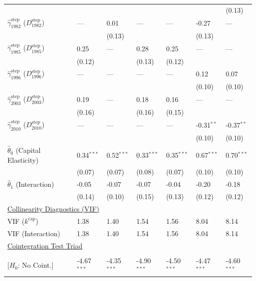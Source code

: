 \begin{table}[H]
\begin{tabular}{p{3.8cm}p{1.35cm}p{1.35cm}p{1.35cm}p{1.35cm}p{1.35cm}p{1.35cm}}
 &  &  &  &  &  & {\scriptsize (0.13)}  \\
$\hat{\gamma}^{\text{step}}_{1982}$ ($D^{\text{step}}_{1982}$)  & --- & 0.01 & --- & --- & -0.27 & ---  \\
 &  & {\scriptsize (0.13)} &  &  & {\scriptsize (0.13)} &   \\
$\hat{\gamma}^{\text{step}}_{1985}$ ($D^{\text{step}}_{1985}$)  & 0.25 & --- & 0.28 & 0.25 & --- & ---  \\
 & {\scriptsize (0.12)} &  & {\scriptsize (0.13)} & {\scriptsize (0.12)} &  &   \\
$\hat{\gamma}^{\text{step}}_{1996}$ ($D^{\text{step}}_{1996}$)  & --- & --- & --- & --- & 0.12 & 0.07  \\
 &  &  &  &  & {\scriptsize (0.10)} & {\scriptsize (0.10)}  \\
$\hat{\gamma}^{\text{step}}_{2003}$ ($D^{\text{step}}_{2003}$)  & 0.19 & --- & 0.18 & 0.16 & --- & ---  \\
 & {\scriptsize (0.16)} &  & {\scriptsize (0.16)} & {\scriptsize (0.15)} &  &   \\
$\hat{\gamma}^{\text{step}}_{2010}$ ($D^{\text{step}}_{2010}$)  & --- & --- & --- & --- & -0.31$^{**}$ & -0.37$^{**}$  \\
 &  &  &  &  & {\scriptsize (0.10)} & {\scriptsize (0.10)}  \\
[1ex]
$\hat{\theta}_0$ (Capital Elasticity)  & 0.34$^{***}$ & 0.52$^{***}$ & 0.33$^{***}$ & 0.35$^{***}$ & 0.67$^{***}$ & 0.70$^{***}$  \\
 & {\scriptsize (0.07)} & {\scriptsize (0.07)} & {\scriptsize (0.08)} & {\scriptsize (0.07)} & {\scriptsize (0.10)} & {\scriptsize (0.10)}  \\
$\hat{\theta}_1$ (Interaction)  & -0.05 & -0.07 & -0.07 & -0.04 & -0.20 & -0.18  \\
 & {\scriptsize (0.14)} & {\scriptsize (0.10)} & {\scriptsize (0.15)} & {\scriptsize (0.13)} & {\scriptsize (0.12)} & {\scriptsize (0.12)}  \\
\midrule
\multicolumn{7}{l}{\underline{Collinearity Diagnostics (VIF)}} \\
VIF ($k^{\text{cap}}$) & 1.38 & 1.40 & 1.54 & 1.56 & 8.04 & 8.14  \\
VIF (Interaction) & 1.38 & 1.40 & 1.54 & 1.56 & 8.04 & 8.14  \\
\midrule
\multicolumn{7}{l}{\underline{Cointegration Test Triad}} \\
\makecell[l]{Resid. ADF ($t_{\text{ADF}}$) \\ {\scriptsize [$H_0$: No Coint.]}} & -4.67$^{***}$ & -4.35$^{***}$ & -4.90$^{***}$ & -4.50$^{***}$ & -4.47$^{***}$ & -4.60$^{***}$  \\

\end{tabular}
\end{table}
